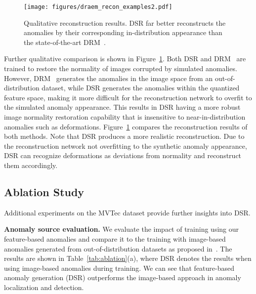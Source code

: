 \documentclass[runningheads]{llncs}
\begin{document}
\begin{figure}
\centering
  \texttt{[image: figures/draem\_recon\_examples2.pdf]}
\caption{
Qualitative reconstruction results. DSR far better reconstructs the anomalies by their corresponding in-distribution appearance than the state-of-the-art 
DRM~\cite{zavrtanik2021draem}.
}
\label{fig:recon_ex}
\end{figure}


Further qualitative comparison is shown in Figure~\ref{fig:recon_ex}. Both DSR and DRM~\cite{zavrtanik2021draem} are trained to restore the normality of images corrupted by simulated anomalies. However, DRM~\cite{zavrtanik2021draem} generates the anomalies in the image space from an out-of-distribution dataset, while DSR generates the anomalies within the quantized feature space, making it more difficult for the reconstruction network to overfit to the simulated anomaly appearance. This results in DSR having a more robust image normality restoration capability that is insensitive to near-in-distribution anomalies such as deformations. Figure~\ref{fig:recon_ex} compares the reconstruction results of both methods. Note that DSR produces a more realistic reconstruction. Due to the reconstruction network not overfitting to the synthetic anomaly appearance, DSR can recognize deformations as deviations from normality and reconstruct them accordingly.















\subsection{Ablation Study}

Additional experiments on the MVTec dataset provide further insights into DSR. 

\textbf{Anomaly source evaluation.} 
We evaluate the impact of training using our feature-based anomalies and compare it to the training with image-based anomalies generated from out-of-distribution datasets as proposed in~\cite{zavrtanik2021draem}. The results are shown in Table~\ref{tab:ablation}(a), where DSR denotes the results when using image-based anomalies during training. We can see that feature-based anomaly generation (DSR) outperforms the image-based approach in anomaly localization and detection.
\end{document}
